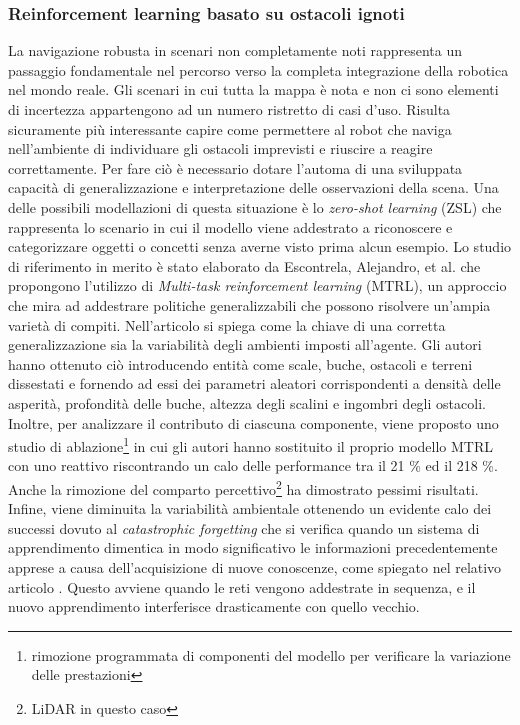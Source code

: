 \subsubsection{Reinforcement learning basato su ostacoli ignoti}
La navigazione robusta in scenari non completamente noti rappresenta un passaggio fondamentale nel percorso verso la completa integrazione della robotica nel mondo reale. Gli scenari in cui tutta la mappa è nota e non ci sono elementi di incertezza appartengono ad un numero ristretto di casi d'uso. Risulta sicuramente più interessante capire come permettere al robot che naviga nell'ambiente di individuare gli ostacoli imprevisti e riuscire a reagire correttamente. Per fare ciò è necessario dotare l'automa di una sviluppata capacità di generalizzazione e interpretazione delle osservazioni della scena. Una delle possibili modellazioni di questa situazione è lo \textit{zero-shot learning} (ZSL) che rappresenta lo scenario in cui il modello viene addestrato a riconoscere e categorizzare oggetti o concetti senza averne visto prima alcun esempio. Lo studio di riferimento in merito è stato elaborato da Escontrela, Alejandro, et al. \cite{escontrela2020zero} che propongono l'utilizzo di \textit{Multi-task reinforcement learning} (MTRL), un approccio che mira ad addestrare politiche generalizzabili che possono risolvere un'ampia varietà di compiti. Nell'articolo si spiega come la chiave di una corretta generalizzazione sia la variabilità degli ambienti imposti all'agente. Gli autori hanno ottenuto ciò introducendo entità come scale, buche, ostacoli e terreni dissestati e fornendo ad essi dei parametri aleatori corrispondenti a densità delle asperità, profondità delle buche, altezza degli scalini e ingombri degli ostacoli. Inoltre, per analizzare il contributo di ciascuna componente, viene proposto uno studio di ablazione\footnote{rimozione programmata di componenti del modello per verificare la variazione delle prestazioni} in cui gli autori hanno sostituito il proprio modello MTRL con uno reattivo riscontrando un calo delle performance tra il 21 \% ed il 218 \%. Anche la rimozione del comparto percettivo\footnote{LiDAR in questo caso} ha dimostrato pessimi risultati. Infine, viene diminuita la variabilità ambientale ottenendo un evidente calo dei successi dovuto al \textit{catastrophic forgetting} che si verifica quando un sistema di apprendimento dimentica in modo significativo le informazioni precedentemente apprese a causa dell'acquisizione di nuove conoscenze, come spiegato nel relativo articolo \cite{mccloskey1989catastrophic}. Questo avviene quando le reti vengono addestrate in sequenza, e il nuovo apprendimento interferisce drasticamente con quello vecchio.

